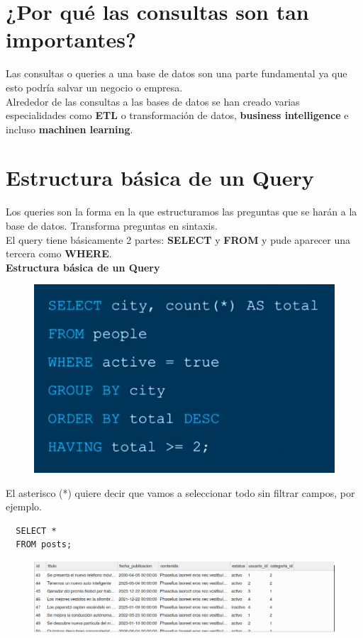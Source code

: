 \documentclass{article}
\begin{document}
\section{¿Por qué las consultas son tan importantes?}%
Las consultas o queries a una base de datos son una parte fundamental ya que
esto podría salvar un negocio o empresa.\\

Alrededor de las consultas a las bases de datos se han creado varias
especialidades como \textbf{ETL} o transformación de datos, \textbf{business
intelligence} e incluso \textbf{machinen learning}.

\section{Estructura básica de un Query}%
Los queries son la forma en la que estructuramos las preguntas que se harán a
la base de datos. Transforma preguntas en sintaxis.\\

El query tiene básicamente 2 partes: \textbf{SELECT} y \textbf{FROM} y pude
aparecer una tercera como \textbf{WHERE}.\\

\textbf{Estructura básica de un Query}
\begin{figure}[h!]
  \centering
  \includegraphics[scale=0.55]{./Pictures/078_query.png}
\end{figure}


El asterisco (*) quiere decir que vamos a seleccionar todo sin filtrar campos, por ejemplo.

\begin{verbatim}
  SELECT *
  FROM posts;
\end{verbatim}
\begin{figure}[h!]
  \centering
  \includegraphics[scale=0.55]{./Pictures/079_select_year.png}
\end{figure}
\end{document}
